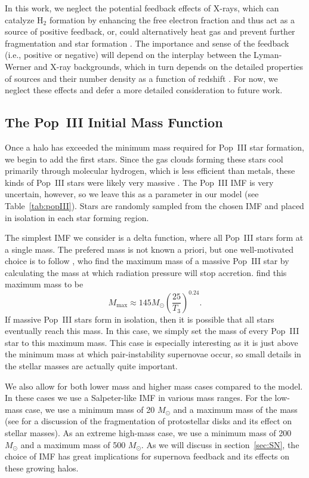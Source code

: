 \documentclass[a4paper,fleqn,usenatbib]{mnras}
\begin{document}
In this work, we neglect the potential feedback effects of X-rays, which can  catalyze 
H$_2$ formation by enhancing the free electron fraction and thus act as a source of positive feedback, or, could alternatively heat gas and prevent further fragmentation and star formation 
\citep[e.g.,][]{machacek_2003,kuhlen_2005}. The importance and sense of the feedback (i.e., positive or negative) will depend on the interplay between the 
Lyman-Werner and X-ray backgrounds, which in turn depends on the detailed properties of sources and their number density as a function of redshift \citep[e.g.,][]{ricotti_2016}. For now, we neglect these effects and defer a more detailed consideration to future work.

\subsection{The Pop~III Initial Mass Function}

Once a halo has exceeded the minimum mass required for Pop~III star formation, we begin to add the first stars. Since the gas clouds forming these stars cool primarily through molecular hydrogen, which is less efficient than metals, these kinds of Pop~III stars were likely very massive \citep{bromm_1999}. The Pop~III IMF is very uncertain, however, so we leave this as a parameter in our model (see Table~\ref{tab:popIII}). Stars are randomly sampled from the chosen IMF and placed in isolation in each star forming region.

The simplest IMF we consider is 
a delta function, where all Pop~III stars form at a single mass. The prefered mass is not known a priori, but one well-motivated choice is to follow \citet{mckee_2008}, who find the maximum mass of a massive Pop~III star by calculating the mass at which 
radiation pressure will stop accretion. 
\citet{mckee_2008} find this maximum mass to be
\begin{equation}
M_{\text{max}} \approx 145 M_\odot \left( \frac{25}{T_3}\right)^{0.24}.
\label{eq:mmax}
\end{equation}
If massive Pop~III stars form in isolation, then it is possible that all stars eventually reach this mass. In this case, we simply set the mass of every Pop~III star to this maximum mass. This case is especially interesting as 
it is just above the minimum mass at which pair-instability supernovae occur, so small details in the stellar masses are actually quite 
important.

We also allow for both 
lower mass and higher mass cases compared to the \citet{mckee_2008} model. In these cases we use a Salpeter-like IMF in various mass ranges. For the low-mass case, we use a minimum mass of 20 $M_\odot$ and a maximum mass of the \citet{mckee_2008} mass (see \citealt{bromm_1999} for a discussion of the fragmentation of protostellar disks and its effect on stellar masses). As an extreme high-mass case, we use a minimum mass of 200 $M_\odot$ and a maximum mass of 500 $M_\odot$. As we will discuss in section~\ref{sec:SN}, the choice of IMF has great implications for supernova feedback and its effects on these growing halos.
\end{document}
